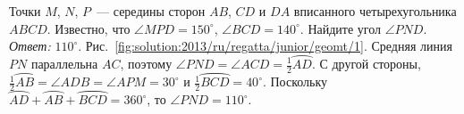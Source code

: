 \problem
Точки $M$, $N$, $P$~--- середины сторон $AB$, $CD$ и $DA$ вписанного
четырехугольника $ABCD$.
Известно, что $\angle MPD = 150^\circ$, $\angle BCD = 140^\circ$.
Найдите угол $\angle PND$. 
%
\label{solution:2013/ru/regatta/junior/geomt/1}%
\emph{Ответ:} $110^\circ$.
Рис.~\ref{fig:solution:2013/ru/regatta/junior/geomt/1}.
Средняя линия $PN$ параллельна $AC$, поэтому
$\angle PND = \angle ACD = \frac{1}{2} \wideparen{AD}$.
С другой стороны,
$\frac{1}{2} \wideparen{AB} = \angle ADB = \angle APM = 30^\circ$
и $\frac{1}{2} \wideparen{BCD} = 40^\circ$.
Поскольку
$\wideparen{AD} + \wideparen{AB} + \wideparen{BCD} = 360^\circ$,
то $\angle PND = 110^\circ$.
\endproblem
